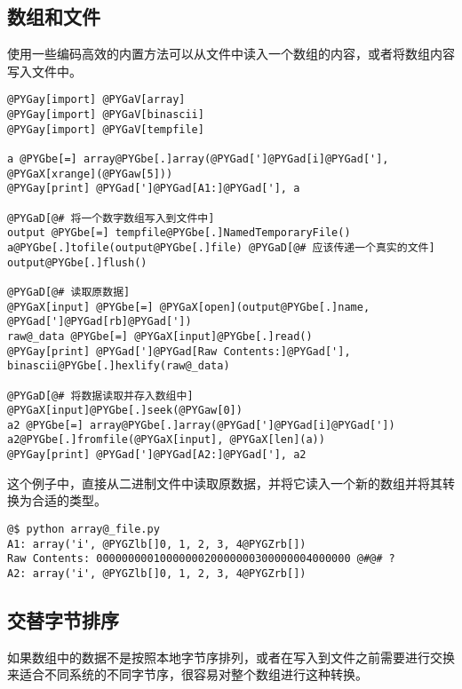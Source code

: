 \documentclass[a4paper,10pt,english]{manual}
\begin{document}
\subsection{数组和文件}

使用一些编码高效的内置方法可以从文件中读入一个数组的内容，或者将数组内容写入文件中。

\begin{Verbatim}[commandchars=@\[\]]
@PYGay[import] @PYGaV[array]
@PYGay[import] @PYGaV[binascii]
@PYGay[import] @PYGaV[tempfile]

a @PYGbe[=] array@PYGbe[.]array(@PYGad[']@PYGad[i]@PYGad['], @PYGaX[xrange](@PYGaw[5]))
@PYGay[print] @PYGad[']@PYGad[A1:]@PYGad['], a

@PYGaD[@# 将一个数字数组写入到文件中]
output @PYGbe[=] tempfile@PYGbe[.]NamedTemporaryFile()
a@PYGbe[.]tofile(output@PYGbe[.]file) @PYGaD[@# 应该传递一个真实的文件]
output@PYGbe[.]flush()

@PYGaD[@# 读取原数据]
@PYGaX[input] @PYGbe[=] @PYGaX[open](output@PYGbe[.]name, @PYGad[']@PYGad[rb]@PYGad['])
raw@_data @PYGbe[=] @PYGaX[input]@PYGbe[.]read()
@PYGay[print] @PYGad[']@PYGad[Raw Contents:]@PYGad['], binascii@PYGbe[.]hexlify(raw@_data)

@PYGaD[@# 将数据读取并存入数组中]
@PYGaX[input]@PYGbe[.]seek(@PYGaw[0])
a2 @PYGbe[=] array@PYGbe[.]array(@PYGad[']@PYGad[i]@PYGad['])
a2@PYGbe[.]fromfile(@PYGaX[input], @PYGaX[len](a))
@PYGay[print] @PYGad[']@PYGad[A2:]@PYGad['], a2
\end{Verbatim}

这个例子中，直接从二进制文件中读取原数据，并将它读入一个新的数组并将其转换为合适的类型。

\begin{Verbatim}[commandchars=@\[\]]
@$ python array@_file.py
A1: array('i', @PYGZlb[]0, 1, 2, 3, 4@PYGZrb[])
Raw Contents: 0000000001000000020000000300000004000000 @#@# ?
A2: array('i', @PYGZlb[]0, 1, 2, 3, 4@PYGZrb[])
\end{Verbatim}


\subsection{交替字节排序}

如果数组中的数据不是按照本地字节序排列，或者在写入到文件之前需要进行交换来适合不同系统的不同字节序，很容易对整个数组进行这种转换。
\end{document}
